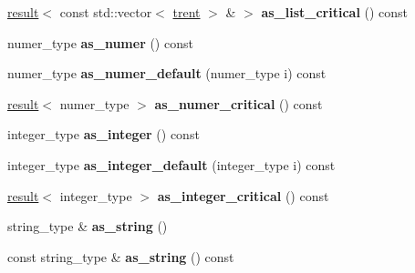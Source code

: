 \begin{DoxyCompactItemize}
\item 
\hyperlink{classgxx_1_1result__type_1_1result}{result}$<$ const std\+::vector$<$ \hyperlink{classgxx_1_1trent}{trent} $>$ \& $>$ {\bfseries as\+\_\+list\+\_\+critical} () const \hypertarget{classgxx_1_1trent_ab0527600d43cd40b0b24c7462635d0c1}{}\label{classgxx_1_1trent_ab0527600d43cd40b0b24c7462635d0c1}

\item 
numer\+\_\+type {\bfseries as\+\_\+numer} () const \hypertarget{classgxx_1_1trent_a58b4884189c28ee17977bc03585b06da}{}\label{classgxx_1_1trent_a58b4884189c28ee17977bc03585b06da}

\item 
numer\+\_\+type {\bfseries as\+\_\+numer\+\_\+default} (numer\+\_\+type i) const \hypertarget{classgxx_1_1trent_a11ff8b70169646516876ed881c5d0883}{}\label{classgxx_1_1trent_a11ff8b70169646516876ed881c5d0883}

\item 
\hyperlink{classgxx_1_1result__type_1_1result}{result}$<$ numer\+\_\+type $>$ {\bfseries as\+\_\+numer\+\_\+critical} () const \hypertarget{classgxx_1_1trent_af675154861f4c7911e603865cbc2d22a}{}\label{classgxx_1_1trent_af675154861f4c7911e603865cbc2d22a}

\item 
integer\+\_\+type {\bfseries as\+\_\+integer} () const \hypertarget{classgxx_1_1trent_a87df50592953d67236925cadf95275de}{}\label{classgxx_1_1trent_a87df50592953d67236925cadf95275de}

\item 
integer\+\_\+type {\bfseries as\+\_\+integer\+\_\+default} (integer\+\_\+type i) const \hypertarget{classgxx_1_1trent_ab7e816a2b29b5d002c19a954aa7fdcd0}{}\label{classgxx_1_1trent_ab7e816a2b29b5d002c19a954aa7fdcd0}

\item 
\hyperlink{classgxx_1_1result__type_1_1result}{result}$<$ integer\+\_\+type $>$ {\bfseries as\+\_\+integer\+\_\+critical} () const \hypertarget{classgxx_1_1trent_a07ff13c82c99595ac4c88b2d4ef0a860}{}\label{classgxx_1_1trent_a07ff13c82c99595ac4c88b2d4ef0a860}

\item 
string\+\_\+type \& {\bfseries as\+\_\+string} ()\hypertarget{classgxx_1_1trent_a4824c9457e1d04b1b3d2b3e9baf21cb9}{}\label{classgxx_1_1trent_a4824c9457e1d04b1b3d2b3e9baf21cb9}

\item 
const string\+\_\+type \& {\bfseries as\+\_\+string} () const \hypertarget{classgxx_1_1trent_a61f2757683905bd822393f643511f51a}{}\label{classgxx_1_1trent_a61f2757683905bd822393f643511f51a}


\end{DoxyCompactItemize}
